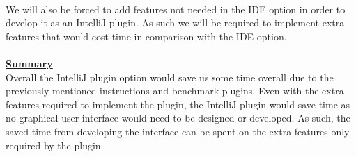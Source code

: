 \\
We will also be forced to add features not needed in the IDE option in order to develop it as an IntelliJ plugin. As such we will be required to implement extra features that would cost time in comparison with the IDE option. \\
\\
 \textbf {\underline{Summary}}\\
 Overall the IntelliJ plugin option would save us some time overall due to the previously mentioned instructions and benchmark plugins. Even with the extra features required to implement the plugin, the IntelliJ plugin would save time as no graphical user interface would need to be designed or developed. As such, the saved time from developing the interface can be spent on the extra features only required by the plugin.
 
